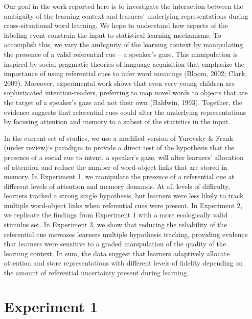 \documentclass[12pt,]{article}
\begin{document}
Our goal in the work reported here is to investigate the interaction
between the ambiguity of the learning context and learners' underlying
representations during cross-situational word learning. We hope to
understand how aspects of the labeling event constrain the input to
statistical learning mechanisms. To accomplish this, we vary the
ambiguity of the learning context by manipulating the presence of a
valid referential cue -- a speaker's gaze. This manipulation is inspired
by social-pragmatic theories of language acquisition that emphasize the
importance of using referential cues to infer word meanings (Bloom,
2002; Clark, 2009). Moreover, experimental work shows that even very
young children are sophisticated intention-readers, preferring to map
novel words to objects that are the target of a speaker's gaze and not
their own (Baldwin, 1993). Together, the evidence suggests that
referential cues could alter the underlying representations by focusing
attention and memory to a subset of the statistics in the input.

In the current set of studies, we use a modified version of Yurovsky \&
Frank (under review)`s paradigm to provide a direct test of the
hypothesis that the presence of a social cue to intent, a speaker's
gaze, will alter learners' allocation of attention and reduce the number
of word-object links that are stored in memory. In Experiment 1, we
manipulate the presence of a referential cue at different levels of
attention and memory demands. At all levels of difficulty, learners
tracked a strong single hypothesis, but learners were less likely to
track multiple word-object links when referential cues were present. In
Experiment 2, we replicate the findings from Experiment 1 with a more
ecologically valid stimulus set. In Experiment 3, we show that reducing
the reliability of the referential cue increases learners multiple
hypothesis tracking, providing evidence that learners were sensitive to
a graded manipulation of the quality of the learning context. In sum,
the data suggest that learners adaptively allocate attention and store
representations with different levels of fidelity depending on the
amount of referential uncertainty present during learning.

\section{Experiment 1}\label{experiment-1}
\end{document}
